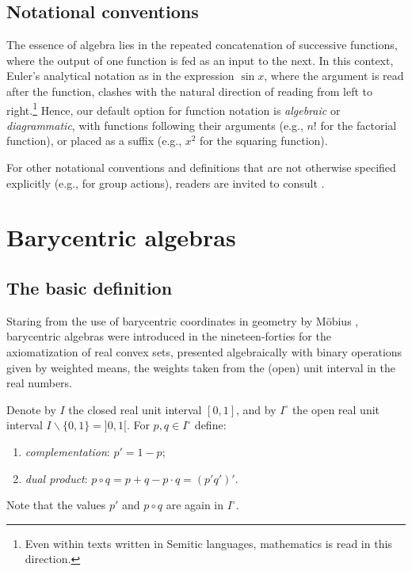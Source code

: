 \documentclass[12pt]{amsart}
\theoremstyle{plain}
\theoremstyle{definition}
\numberwithin{equation}{section}
\begin{document}
\subsection{Notational conventions}


The essence of algebra lies in the repeated concatenation of successive functions, where the output of one function is fed as an input to the next. In this context, Euler's analytical notation as in the expression $\sin x$, where the argument is read after the function, clashes with the natural direction of reading from left to right.\footnote{Even within texts written in Semitic languages, mathematics is read in this direction.}
Hence, our default option for function notation is \emph{algebraic} or \emph{diagrammatic}, with functions following their arguments (e.g., $n!$ for the factorial function), or placed as a suffix (e.g., $x^2$ for the squaring function).

For other notational conventions and definitions that are not otherwise specified explicitly (e.g., for group actions), readers are invited to consult \cite{PMA}.



\section{Barycentric algebras}\label{S:BarycAlg}

\subsection{The basic definition}\label{SS:barycent}

Staring from the use of barycentric coordinates in geometry by M\"obius \cite{Moebius}, barycentric algebras were introduced in the nineteen-forties \cite{Kneser, Stone} for the axiomatization of real convex sets, presented algebraically with binary operations given by weighted means, the weights taken from the (open) unit interval in the real numbers.

Denote by $I$ the closed real unit interval $[0,1]$, and by $I^{\circ}$ the open real unit interval $I\smallsetminus\{0,1\}=]0,1[$.
For $p,q\in I^{\circ}$ define:
\begin{enumerate}
\item[$(\mathrm a)$] \emph{complementation}: $p'=1-p$;
\item[$(\mathrm b)$] \emph{dual product}: $p\circ q = p+q-p\cdot q=(p'q')'$.
\end{enumerate}
Note that the values $p'$ and $p\circ q$ are again in $I^{\circ}$.
\end{document}
